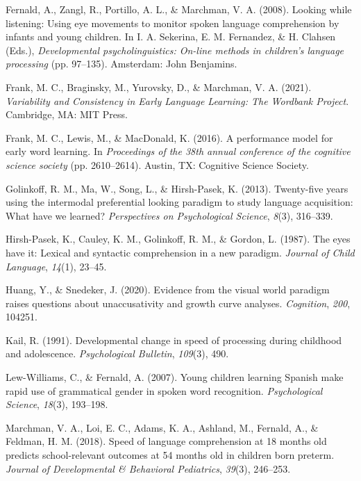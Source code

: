 \documentclass[10pt, letterpaper]{article}
\begin{document}
\leavevmode\hypertarget{ref-Fernald2008}{}%
Fernald, A., Zangl, R., Portillo, A. L., \& Marchman, V. A. (2008).
Looking while listening: Using eye movements to monitor spoken language
comprehension by infants and young children. In I. A. Sekerina, E. M.
Fernandez, \& H. Clahsen (Eds.), \emph{Developmental psycholinguistics:
On-line methods in children's language processing} (pp. 97--135).
Amsterdam: John Benjamins.

\leavevmode\hypertarget{ref-frank2021}{}%
Frank, M. C., Braginsky, M., Yurovsky, D., \& Marchman, V. A. (2021).
\emph{Variability and Consistency in Early Language Learning: The
Wordbank Project}. Cambridge, MA: MIT Press.

\leavevmode\hypertarget{ref-frank2016b}{}%
Frank, M. C., Lewis, M., \& MacDonald, K. (2016). A performance model
for early word learning. In \emph{Proceedings of the 38th annual
conference of the cognitive science society} (pp. 2610--2614). Austin,
TX: Cognitive Science Society.

\leavevmode\hypertarget{ref-Golinkoff2013}{}%
Golinkoff, R. M., Ma, W., Song, L., \& Hirsh-Pasek, K. (2013).
Twenty-five years using the intermodal preferential looking paradigm to
study language acquisition: What have we learned? \emph{Perspectives on
Psychological Science}, \emph{8}(3), 316--339.

\leavevmode\hypertarget{ref-Hirsh-Pasek1987}{}%
Hirsh-Pasek, K., Cauley, K. M., Golinkoff, R. M., \& Gordon, L. (1987).
The eyes have it: Lexical and syntactic comprehension in a new paradigm.
\emph{Journal of Child Language}, \emph{14}(1), 23--45.

\leavevmode\hypertarget{ref-Huang2020}{}%
Huang, Y., \& Snedeker, J. (2020). Evidence from the visual world
paradigm raises questions about unaccusativity and growth curve
analyses. \emph{Cognition}, \emph{200}, 104251.

\leavevmode\hypertarget{ref-kail1991}{}%
Kail, R. (1991). Developmental change in speed of processing during
childhood and adolescence. \emph{Psychological Bulletin}, \emph{109}(3),
490.

\leavevmode\hypertarget{ref-Lew-Williams2007}{}%
Lew-Williams, C., \& Fernald, A. (2007). Young children learning Spanish
make rapid use of grammatical gender in spoken word recognition.
\emph{Psychological Science}, \emph{18}(3), 193--198.

\leavevmode\hypertarget{ref-Marchman2018}{}%
Marchman, V. A., Loi, E. C., Adams, K. A., Ashland, M., Fernald, A., \&
Feldman, H. M. (2018). Speed of language comprehension at 18 months old
predicts school-relevant outcomes at 54 months old in children born
preterm. \emph{Journal of Developmental \& Behavioral Pediatrics},
\emph{39}(3), 246--253.
\end{document}
